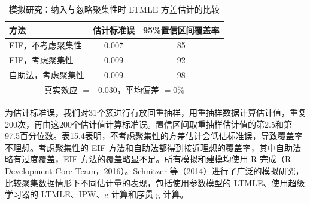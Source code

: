 \begin{table}[htbp]
\centering
\caption{模拟研究：纳入与忽略聚集性时 LTMLE 方差估计的比较}
\label{tab:ch15-simulation}
\small
\begin{tabular}{lcc}
\toprule
方法 & 估计标准误 & 95\%置信区间覆盖率\\
\midrule
EIF，不考虑聚集性 & 0.007 & 85\\
EIF，考虑聚集性 & 0.009 & 92\\
自助法，考虑聚集性 & 0.009 & 98\\
\bottomrule
\multicolumn{3}{c}{真实效应 $=-0.030$，平均偏差 $=0\%$}\\
\end{tabular}
\end{table}

为估计标准误，我们对31个簇进行有放回重抽样，用重抽样数据计算估计值，重复200次，再由这200个估计值计算标准误。置信区间取重抽样估计值的第2.5和第97.5百分位数。表15.4表明，不考虑聚集性的方差估计会低估标准误，导致覆盖率不理想。考虑聚集性的 EIF 方法和自助法都得到接近理想的覆盖率，其中自助法略有过度覆盖，EIF 方法的覆盖略显不足。所有模拟和建模均使用 R 完成（R Development Core Team，2016）。Schnitzer 等（2014）进行了广泛的模拟研究，比较聚集数据情形下不同估计量的表现，包括使用参数模型的 LTMLE、使用超级学习器的 LTMLE、IPW、g 计算和序贯 g 计算。
\FloatBarrier
